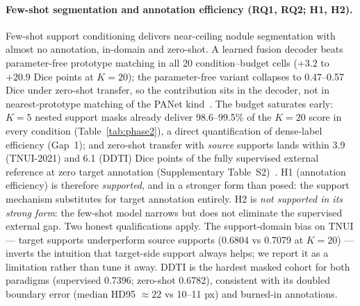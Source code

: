\documentclass[jimh,article,submit,moreauthors,pdftex]{Definitions/tsp}
\begin{document}
\paragraph{Few-shot segmentation and annotation efficiency (RQ1, RQ2; H1,
H2).}
Few-shot support conditioning delivers near-ceiling nodule segmentation
with almost no annotation, in-domain and zero-shot. A learned fusion
decoder beats parameter-free prototype matching in all 20
condition--budget cells ($+3.2$ to $+20.9$ Dice points at $K{=}20$); the
parameter-free variant collapses to 0.47--0.57 Dice under zero-shot
transfer, so the contribution sits in the decoder, not in nearest-prototype
matching of the PANet kind~\cite{rev_wang2019panet,rev_tian2020pfenet,rev_min2021hsnet}.
The budget saturates early: $K{=}5$ nested support masks already deliver
98.6--99.5\% of the $K{=}20$ score in every condition
(Table~\ref{tab:phase2}), a direct quantification of dense-label
efficiency (Gap~1); and zero-shot transfer with \emph{source} supports
lands within 3.9 (TNUI-2021) and 6.1 (DDTI) Dice points of the fully
supervised external reference at zero target annotation (Supplementary
Table~S2)~\cite{rev_gong2021tn3k,rev_pedraza2015ddti}.
H1 (annotation efficiency) is therefore \emph{supported}, and in a
stronger form than posed: the support mechanism substitutes for target
annotation entirely. H2 is \emph{not supported in its strong form}: the
few-shot model narrows but does not eliminate the supervised external
gap. Two honest qualifications apply. The support-domain bias on TNUI
--- target supports underperform source supports (0.6804 vs 0.7079 at
$K{=}20$) --- inverts the intuition that target-side support always
helps; we report it as a limitation rather than tune it away. DDTI is
the hardest masked cohort for both paradigms (supervised 0.7396;
zero-shot 0.6782), consistent with its doubled boundary error (median
HD95 ${\approx}22$ vs 10--11 px) and burned-in annotations.
\end{document}
